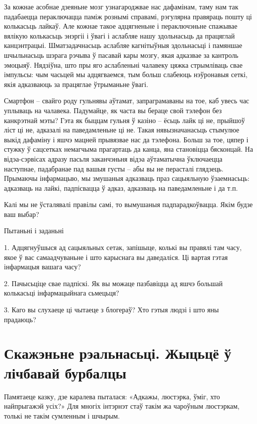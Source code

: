 За кожнае асобнае дзеяньне мозг узнагароджвае нас дафамінам, таму нам так падабаецца пераключацца паміж рознымі справамі, рэгулярна правяраць пошту ці колькасьць лайкаў. Але кожнае такое адцягненьне і пераключэньне спажывае вялікую колькасьць энэргіі і ўвагі і аслабляе нашу здольнасьць да працяглай канцэнтрацыі. Шматзадачнасьць аслабляе кагнітыўныя здольнасьці і памяншае шчыльнасьць шэрага рэчыва ў пасавай кары мозгу, якая адказвае за кантроль эмоцыяў. Нядзіўна, што пры яго аслабленьні чалавеку цяжка стрымліваць свае імпульсы: чым часьцей мы адцягваемся, тым больш слабеюць нэўронавыя сеткі, якія адказваюць за працяглае ўтрыманьне ўвагі.

Смартфон – свайго роду гульнявы аўтамат, запраграмаваны на тое, каб увесь час уплываць на чалавека. Падумайце, як часта вы бераце свой тэлефон без канкрэтнай мэты? Гэта як быццам гульня ў казіно – ёсьць лайк ці не, прыйшоў ліст ці не, адказалі на паведамленьне ці не. Такая нявызначанасьць стымулюе выкід дафаміну і яшчэ мацней прывязвае нас да тэлефона. Больш за тое, цяпер і стужку ў сацсетках немагчыма прагартаць да канца, яна становіцца бясконцай. На відэа-сэрвісах адразу пасьля заканчэньня відэа аўтаматычна ўключаецца наступнае, падабранае пад вашыя густы – абы вы не перасталі глядзець. Прымаючы інфармацыю, мы змушаныя адказваць праз сацыяльную ўзаемнасьць: адказваць на лайкі, падпісвацца ў адказ, адказваць на паведамленьне і да т.п.

Калі мы не ўсталявалі правілы самі, то вымушаныя падпарадкоўвацца. Якім будзе ваш выбар?

Пытаньні і заданьні

1. Адцягнуўшыся ад сацыяльных сетак, запішыце, колькі вы правялі там часу, якое ў вас самаадчуваньне і што карыснага вы даведаліся. Ці вартая гэтая інфармацыя вашага часу?

2. Пачысьціце свае падпіскі. Як вы можаце пазбавіцца ад яшчэ большай колькасьці інфармацыйнага сьмецьця?

3. Каго вы слухаеце ці чытаеце з блогераў? Хто гэтыя людзі і што яны прадаюць?


\section{Скажэньне рэальнасьці. Жыцьцё ў лічбавай бурбалцы}

Памятаеце казку, дзе каралева пыталася: «Адкажы, люстэрка, ўміг, хто найпрыгажэй усіх?» Для многіх інтэрнэт стаў такім жа чароўным люстэркам, толькі не такім сумленным і шчырым.


